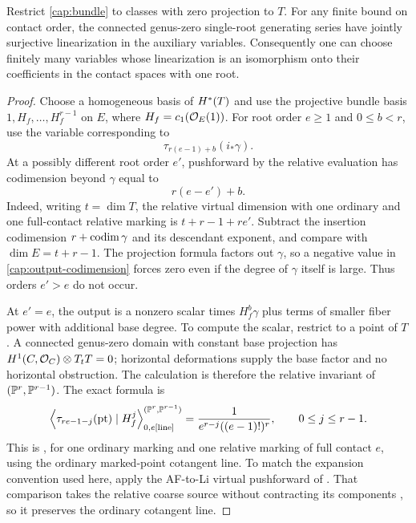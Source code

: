 \begin{lemma}\label{cap:linearization}
Restrict \eqref{cap:bundle} to classes with zero projection to $T$.
For any finite bound on contact order, the connected genus-zero
single-root generating series have jointly surjective linearization in
the auxiliary variables.  Consequently one can choose finitely many
variables whose linearization is an isomorphism onto their coefficients
in the contact spaces with one root.
\end{lemma}
\begin{proof}
Choose a homogeneous basis of $H^*(T)$ and use the projective bundle
basis $1,H_f,\ldots,H_f^{r-1}$ on $E$, where $H_f=c_1(\mathcal O_E(1))$.
For root order $e\geq1$ and $0\leq b<r$, use the variable corresponding
to
\begin{equation}\label{cap:linear-row}
       \tau_{r(e-1)+b}(i_*\gamma).
\end{equation}
At a possibly different root order $e'$, pushforward by the relative
evaluation has codimension beyond $\gamma$ equal to
\begin{equation}\label{cap:output-codimension}
                         r(e-e')+b.
\end{equation}
Indeed, writing $t=\dim T$, the relative virtual dimension with one
ordinary and one full-contact relative marking is $t+r-1+re'$.
Subtract the insertion codimension $r+\operatorname{codim}\gamma$ and its descendant
exponent, and compare with $\dim E=t+r-1$.  The projection formula
factors out $\gamma$, so a negative value in
\eqref{cap:output-codimension} forces zero even if the degree of
$\gamma$ itself is large.  Thus orders $e'>e$ do not occur.

At $e'=e$, the output is a nonzero scalar times $H_f^b\gamma$ plus
terms of smaller fiber power with additional base degree.  To compute
the scalar, restrict to a point of $T$.  A connected genus-zero domain
with constant base projection has
$H^1(C,\mathcal O_C)\otimes T_tT=0$; horizontal deformations supply the base
factor and no horizontal obstruction.  The calculation is therefore
the relative invariant of $(\mathbb P^r,\mathbb P^{r-1})$.  The exact formula is
\begin{equation}\label{cap:HLR}
 \left\langle\tau_{re-1-j}(\mathrm{pt})\mid H_f^j\right\rangle^{
               (\mathbb P^r,\mathbb P^{r-1})}_{0,e[\mathrm{line}]}
       =\frac{1}{e^{r-j}((e-1)!)^r},
       \qquad 0\leq j\leq r-1.
\end{equation}
This is \cite[Theorem~7.1]{HLR2008}, for one ordinary marking and one
relative marking of full contact $e$, using the ordinary marked-point
cotangent line. To match the expansion convention used here, apply the
AF-to-Li virtual pushforward of \cite[Theorem~1.1.2]{AMWComparison}.
That comparison takes the relative coarse source without contracting
its components \cite[Section~4.1]{AMWComparison}, so it preserves the
ordinary cotangent line.


\end{proof}

